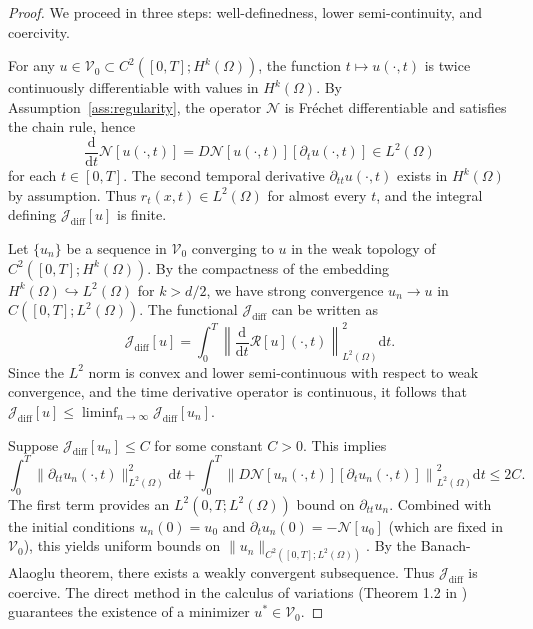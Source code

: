 \documentclass[11pt,reqno]{amsart}
\theoremstyle{plain}
\theoremstyle{definition}
\theoremstyle{remark}
\begin{document}
\begin{proof}
We proceed in three steps: well-definedness, lower semi-continuity, and coercivity.

 For any $u \in \mathcal{V}_0 \subset C^2([0,T]; H^k(\Omega))$, the function $t \mapsto u(\cdot,t)$ is twice continuously differentiable with values in $H^k(\Omega)$. By Assumption~\ref{ass:regularity}, the operator $\mathcal{N}$ is Fréchet differentiable and satisfies the chain rule, hence
\[
\frac{\mathrm{d}}{\mathrm{d}t}\mathcal{N}[u(\cdot,t)] = D\mathcal{N}[u(\cdot,t)][\partial_t u(\cdot,t)] \in L^2(\Omega)
\]
for each $t \in [0,T]$. The second temporal derivative $\partial_{tt} u(\cdot,t)$ exists in $H^k(\Omega)$ by assumption. Thus $r_t(x,t) \in L^2(\Omega)$ for almost every $t$, and the integral defining $\mathcal{J}_{\mathrm{diff}}[u]$ is finite.

 Let $\{u_n\}$ be a sequence in $\mathcal{V}_0$ converging to $u$ in the weak topology of $C^2([0,T]; H^k(\Omega))$. By the compactness of the embedding $H^k(\Omega) \hookrightarrow L^2(\Omega)$ for $k > d/2$, we have strong convergence $u_n \to u$ in $C([0,T]; L^2(\Omega))$. The functional $\mathcal{J}_{\mathrm{diff}}$ can be written as
\[
\mathcal{J}_{\mathrm{diff}}[u] = \int_0^T \left\| \frac{\mathrm{d}}{\mathrm{d}t}\mathcal{R}[u](\cdot,t) \right\|_{L^2(\Omega)}^2 \mathrm{d}t.
\]
Since the $L^2$ norm is convex and lower semi-continuous with respect to weak convergence, and the time derivative operator is continuous, it follows that $\mathcal{J}_{\mathrm{diff}}[u] \leq \liminf_{n \to \infty} \mathcal{J}_{\mathrm{diff}}[u_n]$.

 Suppose $\mathcal{J}_{\mathrm{diff}}[u_n] \leq C$ for some constant $C > 0$. This implies
\[
\int_0^T \|\partial_{tt} u_n(\cdot,t)\|_{L^2(\Omega)}^2 \mathrm{d}t + \int_0^T \left\|D\mathcal{N}[u_n(\cdot,t)][\partial_t u_n(\cdot,t)]\right\|_{L^2(\Omega)}^2 \mathrm{d}t \leq 2C.
\]
The first term provides an $L^2(0,T; L^2(\Omega))$ bound on $\partial_{tt} u_n$. Combined with the initial conditions $u_n(0) = u_0$ and $\partial_t u_n(0) = -\mathcal{N}[u_0]$ (which are fixed in $\mathcal{V}_0$), this yields uniform bounds on $\|u_n\|_{C^2([0,T]; L^2(\Omega))}$. By the Banach-Alaoglu theorem, there exists a weakly convergent subsequence. Thus $\mathcal{J}_{\mathrm{diff}}$ is coercive. The direct method in the calculus of variations (Theorem 1.2 in \cite{dacorogna2007}) guarantees the existence of a minimizer $u^* \in \mathcal{V}_0$.
\end{proof}
\end{document}
